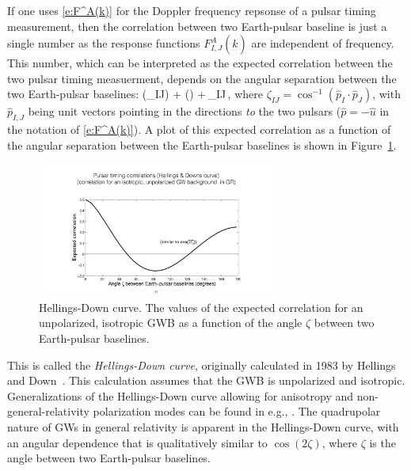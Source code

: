 If one uses \eqref{e:F^A(k)} for the Doppler frequency
repsonse of a pulsar timing measurement, then the correlation
between two Earth-pulsar baseline is just a single number as 
the response functions $F^A_{I,J}(\hat k)$ are independent of
frequency.
This number, which can be interpreted as the expected
correlation between the two pulsar timing measuerment, 
depends on the angular separation between the two 
Earth-pulsar baselines:
%
\be
\chi(\zeta_{IJ})\equiv
{} + \left(\right)
+\,\delta_{IJ}\,,
\label{e:HD}
\ee
%
where $\zeta_{IJ} = \cos^{-1}(\hat p_I\cdot\hat p_J)$, with 
$\hat p_{I,J}$ being unit vectors pointing in the directions
{\em to} the two pulsars ($\hat p=-\hat u$ in the notation 
of \eqref{e:F^A(k)}).
A plot of this expected correlation as a function of the 
angular separation between the Earth-pulsar baselines is
shown in Figure~\ref{f:HD_curve}.
%
\begin{figure}[htbp!]
\begin{center}
\includegraphics[width=0.7\textwidth]{Figures/HD_curve}
\caption{Hellings-Down curve.
The values of the expected correlation for an unpolarized,
isotropic GWB as a function of the angle $\zeta$ between
two Earth-pulsar baselines.}
\label{f:HD_curve}
\end{center}
\end{figure}
%
This is called the {\em Hellings-Down curve}, originally 
calculated in 1983 by Hellings and Down~\cite{Hellings-Down:1983}.
This calculation assumes that the GWB is unpolarized
and isotropic.
Generalizations of the Hellings-Down curve allowing for 
anisotropy and non-general-relativity polarization modes
can be found in e.g., \cite{Mingarelli-et-al, Lee-et-al}.
The quadrupolar nature of GWs in general relativity is
apparent in the Hellings-Down curve, with an angular dependence
that is qualitatively similar to $\cos(2\zeta)$, where 
$\zeta$ is the angle between two Earth-pulsar baselines.

